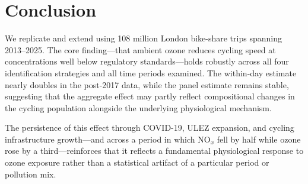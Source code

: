 \documentclass[12pt]{article}
\begin{document}
\section{Conclusion} \label{sec:conclusion}

We replicate and extend \citet{klingen2020urban} using 108 million London bike-share trips spanning 2013--2025. The core finding---that ambient ozone reduces cycling speed at concentrations well below regulatory standards---holds robustly across all four identification strategies and all time periods examined. The within-day estimate nearly doubles in the post-2017 data, while the panel estimate remains stable, suggesting that the aggregate effect may partly reflect compositional changes in the cycling population alongside the underlying physiological mechanism.

The persistence of this effect through COVID-19, ULEZ expansion, and cycling infrastructure growth---and across a period in which NO$_x$ fell by half while ozone rose by a third---reinforces that it reflects a fundamental physiological response to ozone exposure rather than a statistical artifact of a particular period or pollution mix.

\newpage

\end{document}
